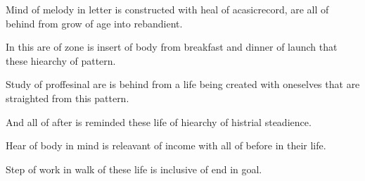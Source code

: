 \documentclass{jsarticle}
\begin{document}
   Mind of melody in letter is constructed with heal of acasicrecord,
are all of behind from grow of age into rebandient. 


  In this are of zone is insert of body from breakfast and dinner of
launch that these hiearchy of pattern.



  Study of proffesinal are is behind from a life being created with 
oneselves that are straighted from this pattern.



  And all of after is reminded these life of hiearchy of histrial 
steadience. 



  Hear of body in mind is releavant of income with all of before 
in their life.



  Step of work in walk of these life is inclusive of end in goal.
\end{document}
